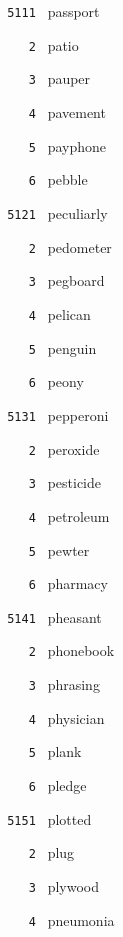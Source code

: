 \documentclass[11pt]{article}
\begin{document}
\begin{multicols}{6}
\small
\noindent \texttt{ 5111 } passport  \par
\noindent \texttt{ \ \ \ 2 } patio  \par
\noindent \texttt{ \ \ \ 3 } pauper  \par
\noindent \texttt{ \ \ \ 4 } pavement  \par
\noindent \texttt{ \ \ \ 5 } payphone  \par
\noindent \texttt{ \ \ \ 6 } pebble  \par
\vspace{3mm}
\noindent \texttt{ 5121 } peculiarly  \par
\noindent \texttt{ \ \ \ 2 } pedometer  \par
\noindent \texttt{ \ \ \ 3 } pegboard  \par
\noindent \texttt{ \ \ \ 4 } pelican  \par
\noindent \texttt{ \ \ \ 5 } penguin  \par
\noindent \texttt{ \ \ \ 6 } peony  \par
\vspace{3mm}
\noindent \texttt{ 5131 } pepperoni  \par
\noindent \texttt{ \ \ \ 2 } peroxide  \par
\noindent \texttt{ \ \ \ 3 } pesticide  \par
\noindent \texttt{ \ \ \ 4 } petroleum  \par
\noindent \texttt{ \ \ \ 5 } pewter  \par
\noindent \texttt{ \ \ \ 6 } pharmacy  \par
\vspace{3mm}
\noindent \texttt{ 5141 } pheasant  \par
\noindent \texttt{ \ \ \ 2 } phonebook  \par
\noindent \texttt{ \ \ \ 3 } phrasing  \par
\noindent \texttt{ \ \ \ 4 } physician  \par
\noindent \texttt{ \ \ \ 5 } plank  \par
\noindent \texttt{ \ \ \ 6 } pledge  \par
\vspace{3mm}
\noindent \texttt{ 5151 } plotted  \par
\noindent \texttt{ \ \ \ 2 } plug  \par
\noindent \texttt{ \ \ \ 3 } plywood  \par
\noindent \texttt{ \ \ \ 4 } pneumonia  \par

\end{multicols}
\end{document}
